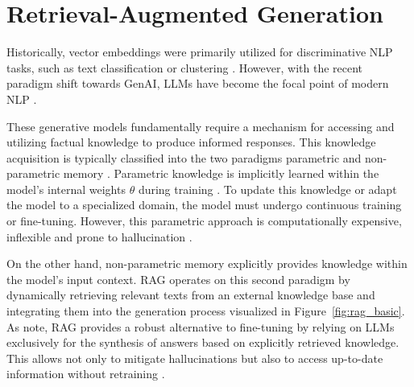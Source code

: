\section{Retrieval-Augmented Generation}
\label{sec:rag}

Historically, vector embeddings were primarily utilized for discriminative \ac{NLP} tasks, such as text classification or clustering \cite{Jurafsky2024_SLP,Mikolov2013,devlin_2019_bert}. However, with the recent paradigm shift towards \ac{GenAI}, \acp{LLM} have become the focal point of modern \ac{NLP} \cite{zhao2026surveylargelanguagemodels}.

These generative models fundamentally require a mechanism for accessing and utilizing factual knowledge to produce informed responses. This knowledge acquisition is typically classified into the two paradigms parametric and non-parametric memory \cite{lewis_rag_2020}. Parametric knowledge is implicitly learned within the model's internal weights $\theta$ during training \cite{petroni_2019_language}. To update this knowledge or adapt the model to a specialized domain, the model must undergo continuous training or fine-tuning. However, this parametric approach is computationally expensive, inflexible and prone to hallucination \cite{Ji_2023_hallucination}. 

On the other hand, non-parametric memory explicitly provides knowledge within the model's input context. \ac{RAG} operates on this second paradigm by dynamically retrieving relevant texts from an external knowledge base and integrating them into the generation process visualized in Figure~\ref{fig:rag_basic}. As \citet{barnett2024seven} note, \ac{RAG} provides a robust alternative to fine-tuning by relying on \acp{LLM} exclusively for the synthesis of answers based on explicitly retrieved knowledge. This allows not only to mitigate hallucinations but also to access up-to-date information without retraining \cite{luketina2025using, lewis_rag_2020, gao_2024_rag}.

